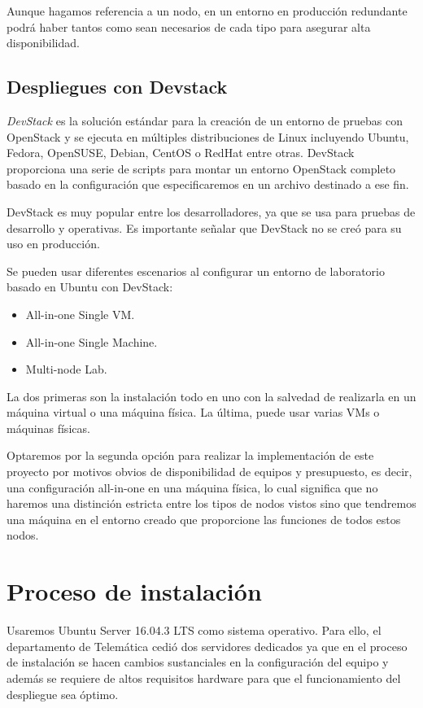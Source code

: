 Aunque hagamos referencia a un nodo, en un entorno en producción redundante podrá haber tantos como sean necesarios de cada tipo para asegurar alta disponibilidad. 

\subsection{Despliegues con Devstack}
\textit{DevStack} es la solución estándar para la creación de un entorno de pruebas con OpenStack y se ejecuta en múltiples distribuciones de Linux incluyendo Ubuntu, Fedora, OpenSUSE, Debian, CentOS o RedHat entre otras. DevStack proporciona una serie de scripts para montar un entorno OpenStack completo basado en la configuración que especificaremos en un archivo destinado a ese fin. 

DevStack es muy popular entre los desarrolladores, ya que se usa para pruebas de desarrollo y operativas. Es importante señalar que DevStack no se creó para su uso en producción.

Se pueden usar diferentes escenarios al configurar un entorno de laboratorio basado en Ubuntu con DevStack:

\begin{itemize}
\item All-in-one Single VM.
\end{itemize}

\begin{itemize}
\item All-in-one Single Machine.
\end{itemize}

\begin{itemize}
\item Multi-node Lab.
\end{itemize}

La dos primeras son la instalación todo en uno con la salvedad de realizarla en un máquina virtual o una máquina física. La última, puede usar varias VMs o máquinas físicas. 

Optaremos por la segunda opción para realizar la implementación de este proyecto por motivos obvios de disponibilidad de equipos y presupuesto, es decir, una configuración all-in-one en una máquina física, lo cual significa que no haremos una distinción estricta entre los tipos de nodos vistos sino que tendremos una máquina en el entorno creado que proporcione las funciones de todos estos nodos.

\section{Proceso de instalación}
Usaremos Ubuntu Server 16.04.3 LTS como sistema operativo. Para ello, el departamento de Telemática cedió dos servidores dedicados ya que en el proceso de instalación se hacen cambios sustanciales en la configuración del equipo y además se requiere de altos requisitos hardware para que el funcionamiento del despliegue sea óptimo.

